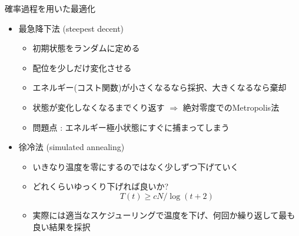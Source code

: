 \documentclass[dvipdfmx]{beamer}
\begin{document}
\begin{frame}[t,fragile]{確率過程を用いた最適化}
  \begin{itemize}
    \setlength{\itemsep}{1em}
  \item 最急降下法 (steepest decent)
    \begin{itemize}
    \item 初期状態をランダムに定める
    \item 配位を少しだけ変化させる
    \item エネルギー(コスト関数)が小さくなるなら採択、大きくなるなら棄却
    \item 状態が変化しなくなるまでくり返す $\Rightarrow$ 絶対零度でのMetropolis法
    \item 問題点 : エネルギー極小状態にすぐに捕まってしまう
    \end{itemize}
  \item 徐冷法 (simulated annealing)
    \begin{itemize}
    \item いきなり温度を零にするのではなく少しずつ下げていく
    \item どれくらいゆっくり下げれば良いか?
      \[
      T(t) \ge cN / \log(t+2)
      \]
    \item 実際には適当なスケジューリングで温度を下げ、何回か繰り返して最も良い結果を採択
    \end{itemize}
  \end{itemize}
\end{frame}
\end{document}
